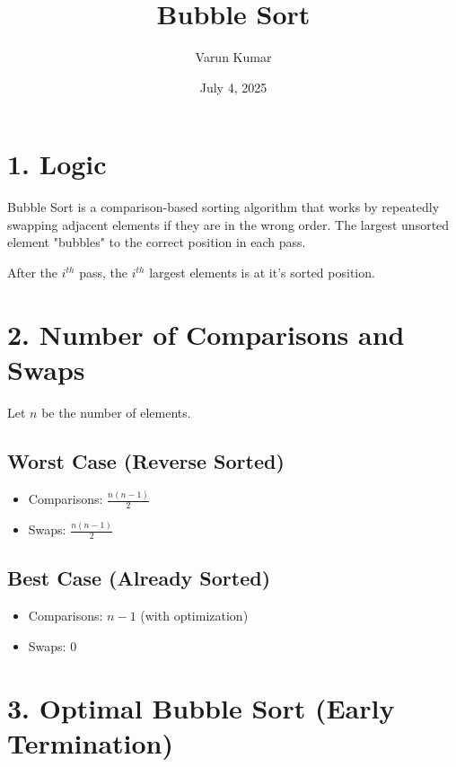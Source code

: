 \documentclass[14pt]{extarticle}
\title{\textbf{Bubble Sort}}
\author{Varun Kumar}
\date{July 4, 2025}
\begin{document}
\maketitle

\section*{1. Logic}

Bubble Sort is a comparison-based sorting algorithm that works by repeatedly swapping adjacent elements if they are in the wrong order. The largest unsorted element "bubbles" to the correct position in each pass.


\begin{tcolorbox}[
  colback=white,        %
  colframe=black,       %
  title=key Idea
]
After the $i^{th}$ pass, the $i^{th}$ largest elements is at it's sorted position.
\end{tcolorbox}

\section*{2. Number of Comparisons and Swaps}

Let $n$ be the number of elements.

\subsection*{Worst Case (Reverse Sorted)}

\begin{itemize}
    \item Comparisons: $\frac{n(n-1)}{2}$
    \item Swaps: $\frac{n(n-1)}{2}$
\end{itemize}

\subsection*{Best Case (Already Sorted)}

\begin{itemize}
    \item Comparisons: $n - 1$ (with optimization)
    \item Swaps: $0$
\end{itemize}

\section*{3. Optimal Bubble Sort (Early Termination)}
\end{document}

